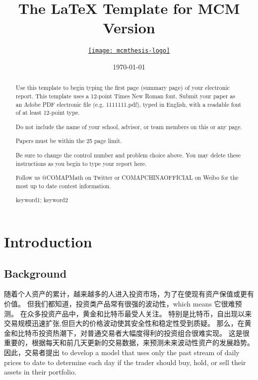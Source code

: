 \documentclass{mcmthesis}
\title{The \LaTeX{} Template for MCM Version \MCMversion}
\author{\small \href{https://www.latexstudio.net/}
  {\texttt{[image: mcmthesis-logo]}}}
\date{\today}
\begin{document}
\begin{abstract}
Use this template to begin typing the first page (summary page) of your electronic report. This template uses a 12-point Times New Roman font. Submit your paper as an Adobe PDF electronic file (e.g. 1111111.pdf), typed in English, with a readable font of at least 12-point type.

Do not include the name of your school, advisor, or team members on this or any page.

Papers must be within the 25 page limit.


Be sure to change the control number and problem choice above.
You may delete these instructions as you begin to type your report here.

Follow us @COMAPMath on Twitter or COMAPCHINAOFFICIAL on Weibo for the most up to date contest information.

\begin{keywords}
keyword1; keyword2
\end{keywords}
\end{abstract}
\maketitle

\section{Introduction}
\subsection{Background}
随着个人资产的累计，越来越多的人进入投资市场，为了在使现有资产保值或更有价值。
但我们都知道，投资类产品常有很强的波动性，which means 它很难预测。
在众多投资产品中，黄金和比特币最受人关注。
特别是比特币，自出现以来交易规模迅速扩张,但巨大的价格波动使其安全性和稳定性受到质疑。
那么，在黄金和比特币投资热潮下，对普通交易者大幅度得利的投资组合很难实现。
这是很重要的，根据每天和前几天更新的交易数据，来预测未来波动性资产的发展趋势。
因此，交易者提出 to develop a model that uses only the past stream of daily prices 
to date to determine each day if the trader should buy, hold, or sell their assets in their portfolio.
\end{document}

